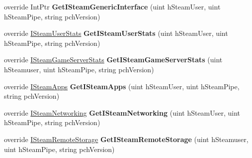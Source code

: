 \begin{DoxyCompactItemize}
\item 
\mbox{\label{class_valve_1_1_steamworks_1_1_c_steam_client_a7b37461a9174d395cbf0e9dd9277207d}} 
override Int\+Ptr {\bfseries Get\+I\+Steam\+Generic\+Interface} (uint h\+Steam\+User, uint h\+Steam\+Pipe, string pch\+Version)
\item 
\mbox{\label{class_valve_1_1_steamworks_1_1_c_steam_client_a9d0ce0e5a0c5337718c13052e2a1533b}} 
override \hyperlink{class_valve_1_1_steamworks_1_1_i_steam_user_stats}{I\+Steam\+User\+Stats} {\bfseries Get\+I\+Steam\+User\+Stats} (uint h\+Steam\+User, uint h\+Steam\+Pipe, string pch\+Version)
\item 
\mbox{\label{class_valve_1_1_steamworks_1_1_c_steam_client_a29b3c2377029fde0a61a89e73e1d9a28}} 
override \hyperlink{class_valve_1_1_steamworks_1_1_i_steam_game_server_stats}{I\+Steam\+Game\+Server\+Stats} {\bfseries Get\+I\+Steam\+Game\+Server\+Stats} (uint h\+Steamuser, uint h\+Steam\+Pipe, string pch\+Version)
\item 
\mbox{\label{class_valve_1_1_steamworks_1_1_c_steam_client_a3f2f35ca227f15416472810ececda405}} 
override \hyperlink{class_valve_1_1_steamworks_1_1_i_steam_apps}{I\+Steam\+Apps} {\bfseries Get\+I\+Steam\+Apps} (uint h\+Steam\+User, uint h\+Steam\+Pipe, string pch\+Version)
\item 
\mbox{\label{class_valve_1_1_steamworks_1_1_c_steam_client_a0dc31a9735234391ee54dc5ee6aa60b7}} 
override \hyperlink{class_valve_1_1_steamworks_1_1_i_steam_networking}{I\+Steam\+Networking} {\bfseries Get\+I\+Steam\+Networking} (uint h\+Steam\+User, uint h\+Steam\+Pipe, string pch\+Version)
\item 
\mbox{\label{class_valve_1_1_steamworks_1_1_c_steam_client_a23790ebf3aab4c95ceba23f1e8fe4a84}} 
override \hyperlink{class_valve_1_1_steamworks_1_1_i_steam_remote_storage}{I\+Steam\+Remote\+Storage} {\bfseries Get\+I\+Steam\+Remote\+Storage} (uint h\+Steamuser, uint h\+Steam\+Pipe, string pch\+Version)
\item 
\mbox{\label{class_valve_1_1_steamworks_1_1_c_steam_client_a089e7c5b6c3f52812517a121c00eb542}} 

\end{DoxyCompactItemize}

